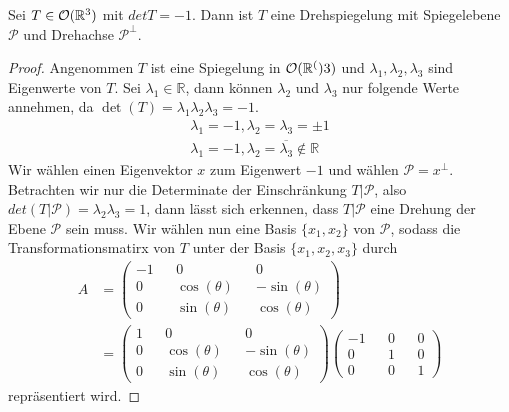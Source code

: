 \begin{theorem}
 Sei $T\in{\mathcal{O}(\mathbb{R}^3)}$ mit $det T = -1$. Dann ist $T$ eine Drehspiegelung mit Spiegelebene $\mathcal{P}$ und Drehachse $\mathcal{P}^{\perp}$.
\end{theorem}
\begin{proof}
 Angenommen $T$ ist eine Spiegelung in ${\mathcal{O}(\mathbb{R}^()}3)$ und $\lambda_1,\lambda_2,\lambda_3$ sind Eigenwerte von $T$. Sei $\lambda_1 \in \mathbb{R}$, dann können $\lambda_2$ und $\lambda_3$ nur folgende Werte annehmen, da $\det(T)=\lambda_1\lambda_2\lambda_3=-1$.
 \setcounter{equation}{0}
 \begin{align}
  \lambda_1=-1, \lambda_2=\lambda_3=\pm1 \\
  \lambda_1=-1, \lambda_2=\overline{\lambda_3}\notin \mathbb{R}
 \end{align}
 Wir wählen einen Eigenvektor $x$ zum Eigenwert $-1$ und wählen $\mathcal{P}=x^{\perp}$. Betrachten wir nur die Determinate der Einschränkung $T|\mathcal{P}$, also $det(T|\mathcal{P})=\lambda_2\lambda_3=1$, dann lässt sich erkennen, dass $T|\mathcal{P}$ eine Drehung der Ebene $\mathcal{P}$ sein muss. Wir wählen nun eine Basis $\{x_1,x_2\}$ von $\mathcal{P}$, sodass die Transformationsmatirx von $T$ unter der Basis $\{x_1,x_2,x_3\}$ durch \begin{align*}
  A&=
\begin{pmatrix}
        -1 && 0 && 0 \\
        0 && \cos(\theta) && -\sin(\theta) \\
        0 && \sin(\theta) && \cos(\theta)
       \end{pmatrix} \\ &=
       \begin{pmatrix}
        1 && 0 && 0 \\
        0 && \cos(\theta) && -\sin(\theta) \\
        0 && \sin(\theta) && \cos(\theta)
       \end{pmatrix} 
       \begin{pmatrix}
        -1 && 0 && 0 \\
        0 && 1 && 0 \\
        0 && 0 && 1
       \end{pmatrix}
 \end{align*}
repräsentiert wird.
\end{proof}



